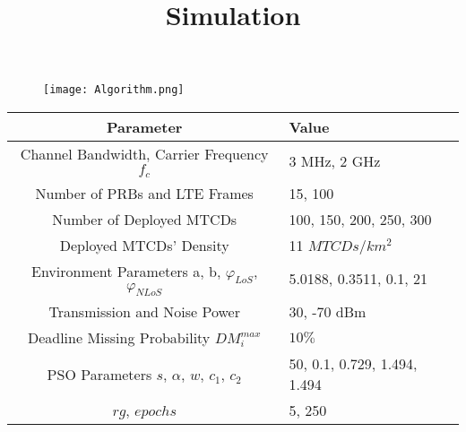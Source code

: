 \documentclass{beamer}
\begin{document}
\begin{frame}{}
    \begin{figure}[h!]
    \centering
    \texttt{[image: Algorithm.png]}
    \label{fig:Algorithm}
    \end{figure}
\end{frame}
\title{Simulation}
\author{}
\begin{frame}{}
    \titlepage
\end{frame}
\begin{frame}{}
    \begin{block}{}
    \begin{table}[]
        \centering
        \renewcommand{\arraystretch}{1.4}
        \begin{tabular}{||c|m{4cm}||}
            \hline
            Parameter & Value \\ 
            \hline
            \hline
            Channel Bandwidth, Carrier Frequency $f_c$ & 3 MHz, 2 GHz\\ 
            \hline
            Number of PRBs and LTE Frames & 15, 100\\ 
            \hline
            Number of Deployed MTCDs & 100, 150, 200, 250, 300\\
            \hline
            Deployed MTCDs’ Density & 11 $MTCDs/km^2$\\
            \hline
            Environment Parameters a, b, $\varphi_{LoS}$, $\varphi_{NLoS}$ & 5.0188, 0.3511, 0.1, 21\\
            \hline
            Transmission and Noise Power & 30, -70 dBm\\
            \hline
            Deadline Missing Probability $DM_i^{max}$ & $10\%$\\
            \hline
            PSO Parameters $s$, $\alpha$, $w$, $c_1$, $c_2$ & 50, 0.1, 0.729, 1.494, 1.494\\
            \hline
            $rg$, $epochs$ & 5, 250\\
            \hline
        \end{tabular}
        \label{tab:Table3}
    \end{table}
    \end{block}
\end{frame}
\end{document}
